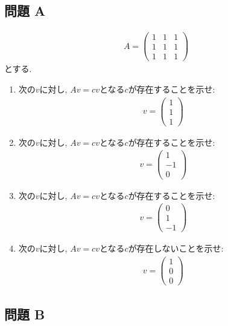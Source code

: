 \subsection{問題 A}
\begin{quiz}
  \begin{align*}
    A=
    \begin{pmatrix}
      1&1&1\\
      1&1&1\\
      1&1&1
    \end{pmatrix}
  \end{align*}
  とする.
  \begin{enumerate}
  \item 次の$v$に対し, $Av=cv$となる$c$が存在することを示せ:
    \begin{align*}
      v=\begin{pmatrix}1\\1\\1\end{pmatrix}
    \end{align*}
  \item 次の$v$に対し, $Av=cv$となる$c$が存在することを示せ:
    \begin{align*}
      v=\begin{pmatrix}1\\-1\\0\end{pmatrix}
    \end{align*}
  \item 次の$v$に対し, $Av=cv$となる$c$が存在することを示せ:
    \begin{align*}
      v=\begin{pmatrix}0\\1\\-1\end{pmatrix}
    \end{align*}
  \item 次の$v$に対し, $Av=cv$となる$c$が存在しないことを示せ:
    \begin{align*}
      v=\begin{pmatrix}1\\0\\0\end{pmatrix}
    \end{align*}
  \end{enumerate}
\end{quiz}

\subsection{問題 B}

